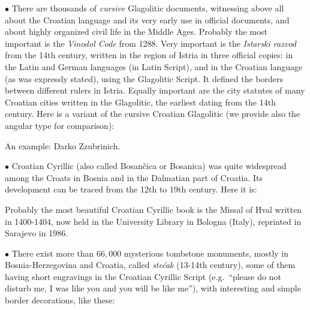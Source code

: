 \noindent$\bullet$ There are thousands of
{\it cursive\/} Glagolitic
documents, witnessing above all about the Croatian language
and its very early use in official documents, and about
 highly organized civil life
 in the Middle Ages. Probably the
most important is the {\it Vinodol Code\/} from  1288.
  Very important
is the {\it Istarski razvod\/} from
the 14th century, written in  the region of Istria in three
official copies:
in the Latin and German languages (in Latin Script), and in
the
Croatian language (as was expressly stated), using the
Glagolitic Script. It defined the borders between different
rulers in Istria.
Equally important are the city
statutes of many Croatian cities written in the Glagolitic, the earliest  dating  from
the 14th century. Here is
a variant of the cursive Croatian Glagolitic
 (we provide also the angular type for comparison):



\noindent An example: {\kur Darko Zzubrinich}.

\medskip

\noindent$\bullet$ Croatian Cyrillic (also called Bosan\v
cica or Bosanica)
 was quite widespread
among the Croats in Bosnia and in the Dalmatian part of Croatia.
Its development
can be traced from the 12th to 19th century.
Here it is:




\noindent Probably the most beautiful Croatian Cyrillic book
is the Missal of Hval written in 1400-1404, now held in the University
Library in Bologna (Italy), reprinted in Sarajevo in 1986.
\medskip


\noindent$\bullet$ There
exist more than $66,000$ mysterious tombstone monuments, mostly in
Bosnia-Herzegovina and  Croatia, called  {\it ste\'cak\/}
 (13-14th century),
some of them having short engravings in the
Croatian Cyrillic Script (e.g.\ ``please do not
disturb me, I was like you and
you will be like me''), with  interesting and simple border
decorations, like these:
\medskip
\cvijet
\smallskip
\kukagd
\smallskip
{}
\smallskip
\Oo


